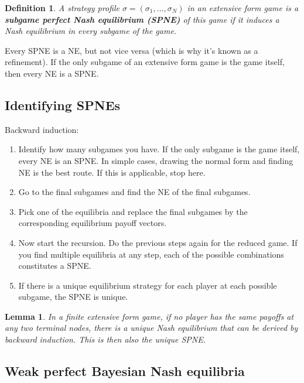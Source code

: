 \documentclass[letter, 10pt]{article}
\newtheorem{definition}{Definition}[section]
\newtheorem{lemma}[theorem]{Lemma}
\begin{document}
\begin{spacing}{1.1}
\begin{definition}
  A strategy profile $\sigma = (\sigma_1, \ldots, \sigma_N)$ in an
  extensive form game is a \textbf{subgame perfect Nash equilibrium (SPNE)}
  of this game if it induces a Nash equilibrium in every subgame of the
  game.
\end{definition}

Every SPNE is a NE, but not vice versa (which is why it's known as a
refinement). If the only subgame of an extensive form game is the game
itself, then every NE is a SPNE.

\subsection{Identifying SPNEs}

Backward induction:

\begin{enumerate}
\item Identify how many subgames you have. If the only subgame is the game
  itself, every NE is an SPNE. In simple cases, drawing the normal form and
  finding NE is the best route. If this is applicable, stop here.
\item Go to the final subgames and find the NE of the final subgames.
\item Pick one of the equilibria and replace the final subgames by the
  corresponding equilibrium payoff vectors.
\item Now start the recursion. Do the previous steps again for the reduced
  game. If you find multiple equilibria at any step, each of the possible
  combinations constitutes a SPNE.
\item If there is a unique equilibrium strategy for each player at each
  possible subgame, the SPNE is unique.
\end{enumerate}

\begin{lemma}
  In a finite extensive form game, if no player has the same payoffs at any
  two terminal nodes, there is a unique Nash equilibrium that can be
  derived by backward induction. This is then also the unique SPNE.
\end{lemma}

\subsection{Weak perfect Bayesian Nash equilibria}


\end{spacing}
\end{document}

